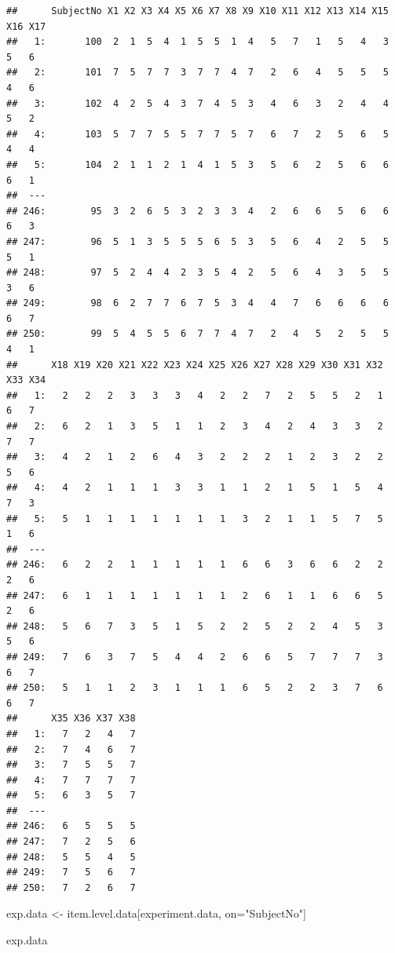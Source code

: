 \documentclass[]{book}
\newenvironment{Shaded}{\begin{snugshade}}{\end{snugshade}}
\newcommand{\StringTok}[1]{\textcolor[rgb]{0.31,0.60,0.02}{#1}}
\newcommand{\NormalTok}[1]{#1}
\theoremstyle{definition}
\theoremstyle{definition}
\theoremstyle{definition}
\theoremstyle{remark}
\begin{document}
\begin{verbatim}
##      SubjectNo X1 X2 X3 X4 X5 X6 X7 X8 X9 X10 X11 X12 X13 X14 X15 X16 X17
##   1:       100  2  1  5  4  1  5  5  1  4   5   7   1   5   4   3   5   6
##   2:       101  7  5  7  7  3  7  7  4  7   2   6   4   5   5   5   4   6
##   3:       102  4  2  5  4  3  7  4  5  3   4   6   3   2   4   4   5   2
##   4:       103  5  7  7  5  5  7  7  5  7   6   7   2   5   6   5   4   4
##   5:       104  2  1  1  2  1  4  1  5  3   5   6   2   5   6   6   6   1
##  ---                                                                     
## 246:        95  3  2  6  5  3  2  3  3  4   2   6   6   5   6   6   6   3
## 247:        96  5  1  3  5  5  5  6  5  3   5   6   4   2   5   5   5   1
## 248:        97  5  2  4  4  2  3  5  4  2   5   6   4   3   5   5   3   6
## 249:        98  6  2  7  7  6  7  5  3  4   4   7   6   6   6   6   6   7
## 250:        99  5  4  5  5  6  7  7  4  7   2   4   5   2   5   5   4   1
##      X18 X19 X20 X21 X22 X23 X24 X25 X26 X27 X28 X29 X30 X31 X32 X33 X34
##   1:   2   2   2   3   3   3   4   2   2   7   2   5   5   2   1   6   7
##   2:   6   2   1   3   5   1   1   2   3   4   2   4   3   3   2   7   7
##   3:   4   2   1   2   6   4   3   2   2   2   1   2   3   2   2   5   6
##   4:   4   2   1   1   1   3   3   1   1   2   1   5   1   5   4   7   3
##   5:   5   1   1   1   1   1   1   1   3   2   1   1   5   7   5   1   6
##  ---                                                                    
## 246:   6   2   2   1   1   1   1   1   6   6   3   6   6   2   2   2   6
## 247:   6   1   1   1   1   1   1   1   2   6   1   1   6   6   5   2   6
## 248:   5   6   7   3   5   1   5   2   2   5   2   2   4   5   3   5   6
## 249:   7   6   3   7   5   4   4   2   6   6   5   7   7   7   3   6   7
## 250:   5   1   1   2   3   1   1   1   6   5   2   2   3   7   6   6   7
##      X35 X36 X37 X38
##   1:   7   2   4   7
##   2:   7   4   6   7
##   3:   7   5   5   7
##   4:   7   7   7   7
##   5:   6   3   5   7
##  ---                
## 246:   6   5   5   5
## 247:   7   2   5   6
## 248:   5   5   4   5
## 249:   7   5   6   7
## 250:   7   2   6   7
\end{verbatim}

\begin{Shaded}
\begin{Highlighting}[]
\NormalTok{exp.data <-}\StringTok{ }\NormalTok{item.level.data[experiment.data, on=}\StringTok{"SubjectNo"}\NormalTok{]}

\NormalTok{exp.data}
\end{Highlighting}
\end{Shaded}
\end{document}
